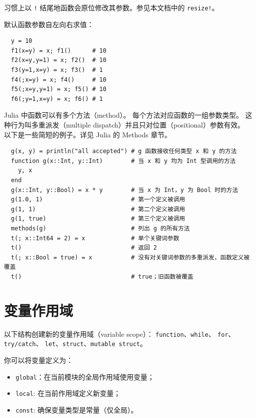 \documentclass[10pt,a4paper]{article}
\begin{document}
习惯上以 \lstinline|!| 结尾地函数会原位修改其参数。参见本文档中的 \lstinline|resize!|。

默认函数参数自左向右求值：
\begin{lstlisting}
  y = 10
  f1(x=y) = x; f1()      # 10
  f2(x=y,y=1) = x; f2()  # 10
  f3(y=1,x=y) = x; f3()  # 1
  f4(;x=y) = x; f4()     # 10
  f5(;x=y,y=1) = x; f5() # 10
  f6(;y=1,x=y) = x; f6() # 1
\end{lstlisting}

Julia 中\textsf{函数}可以有多个\textsf{方法}（method）。
每个方法对应函数的一组参数类型。
这种行为叫多重派发（multiple dispatch）并且只对位置（positional）参数有效。
以下是一些简短的例子。详见 Julia 的 Methods 章节。
\begin{lstlisting}
  g(x, y) = println("all accepted") # g 函数接收任何类型 x 和 y 的方法
  function g(x::Int, y::Int)        # 当 x 和 y 均为 Int 型调用的方法
    y, x
  end
  g(x::Int, y::Bool) = x * y        # 当 x 为 Int，y 为 Bool 时的方法
  g(1.0, 1)                         # 第一个定义被调用
  g(1, 1)                           # 第二个定义被调用
  g(1, true)                        # 第三个定义被调用
  methods(g)                        # 列出 g 的所有方法
  t(; x::Int64 = 2) = x             # 单个关键词参数
  t()                               # 返回 2
  t(; x::Bool = true) = x           # 没有对关键词参数的多重派发，函数定义被覆盖
  t()                               # true；旧函数被覆盖
\end{lstlisting}

\section{变量作用域}
以下结构创建新的变量作用域（variable scope）：
\lstinline|function|、\lstinline|while|、
\lstinline|for|、\lstinline|try/catch|、
\lstinline|let|、\lstinline|struct|、\lstinline|mutable struct|。

你可以将变量定义为：
\begin{itemize}
  \item \lstinline|global|：在当前模块的全局作用域使用变量；
  \item \lstinline|local|: 在当前作用域定义新变量；
  \item \lstinline|const|: 确保变量类型是常量（仅全局）。
\end{itemize}
\end{document}
